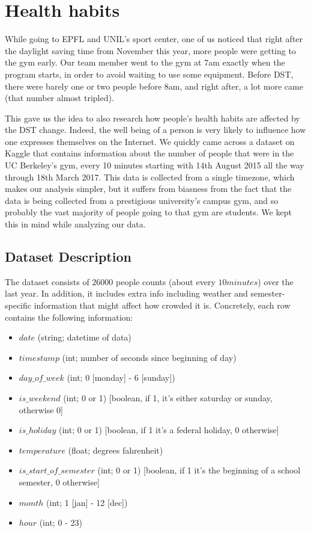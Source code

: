 \documentclass[11pt]{article}
\begin{document}
\section{Health habits}
\label{sec:health}

While going to EPFL and UNIL's sport center, one of us noticed that right after
the daylight saving time from November this year, more people were getting to the
gym early. Our team member went to the gym at 7am exactly when the program
starts, in order to avoid waiting to use some equipment. Before DST, there
were barely one or two people before 8am, and right after, a lot more came (that number
almost tripled).

This gave us the idea to also research how people's health habits are affected by
the DST change. Indeed, the well being of a person is very likely to influence how one expresses themselves on the Internet. We quickly came across a dataset on Kaggle \cite{crodwnGymKaggle} that contains information about the number of people that were in the UC Berkeley's gym, every 10 minutes starting with 14th August 2015 all the way through 18th March 2017. This data is collected from a single timezone, which makes our analysis simpler, but it suffers from biasness from the fact that the data is being collected from a prestigious university's campus gym, and so probably the vast majority of people going to that gym are students. We kept this in mind while analyzing our data.

\subsection{Dataset Description}

The dataset consists of $26000$ people counts (about every $10 minutes$) over the last year. In addition, it includes extra info including weather and semester-specific information that might affect how crowded it is. Concretely, each row contains the following information:

\begin{itemize}
    \item $date$ (string; datetime of data)
    \item $timestamp$ (int; number of seconds since beginning of day)
    \item $day\_of\_week$ (int; 0 [monday] - 6 [sunday])
    \item $is\_weekend$ (int; 0 or 1) [boolean, if 1, it's either saturday or sunday, otherwise 0]
    \item $is\_holiday$ (int; 0 or 1) [boolean, if 1 it's a federal holiday, 0 otherwise]
    \item $temperature$ (float; degrees fahrenheit)
    \item $is\_start\_of\_semester$ (int; 0 or 1) [boolean, if 1 it's the beginning of a school semester, 0 otherwise]
    \item $month$ (int; 1 [jan] - 12 [dec])
    \item $hour$ (int; 0 - 23)
\end{itemize}
\end{document}
